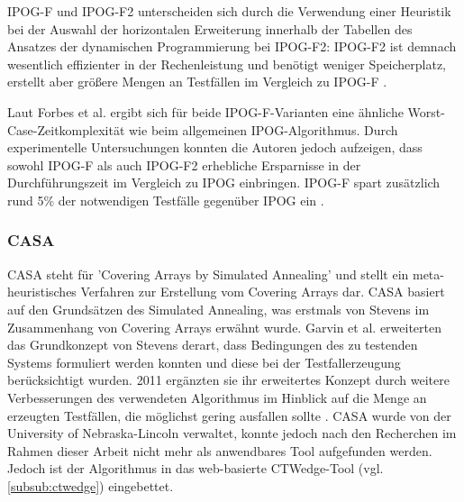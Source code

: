 IPOG-F und IPOG-F2 unterscheiden sich durch die Verwendung einer Heuristik bei der Auswahl der horizontalen Erweiterung innerhalb der Tabellen des Ansatzes der dynamischen Programmierung bei IPOG-F2: IPOG-F2 ist demnach wesentlich effizienter in der Rechenleistung und benötigt weniger Speicherplatz, erstellt aber größere Mengen an Testfällen im Vergleich zu IPOG-F \cite{forbes2008refining}. 

Laut Forbes et al. \cite{forbes2008refining} ergibt sich für beide IPOG-F-Varianten eine ähnliche Worst-Case-Zeitkomplexität wie beim allgemeinen IPOG-Algorithmus. Durch experimentelle Untersuchungen konnten die Autoren jedoch aufzeigen, dass sowohl IPOG-F als auch IPOG-F2 erhebliche Ersparnisse in der Durchführungszeit im Vergleich zu IPOG einbringen. IPOG-F spart zusätzlich rund 5\% der notwendigen Testfälle gegenüber IPOG ein \cite{forbes2008refining}.



\subsubsection{CASA}\label{subsub:casa}

CASA \cite{garvin2009improved, garvin2011evaluating} steht für 'Covering Arrays by Simulated Annealing' und stellt ein meta-heuristisches Verfahren zur Erstellung vom Covering Arrays dar. CASA basiert auf den Grundsätzen des Simulated Annealing, was erstmals von Stevens \cite{stevens1999transversal} im Zusammenhang von Covering Arrays erwähnt wurde. Garvin et al. \cite{garvin2009improved} erweiterten das Grundkonzept von Stevens derart, dass Bedingungen des zu testenden Systems formuliert werden konnten und diese bei der Testfallerzeugung berücksichtigt wurden. 2011 ergänzten sie ihr erweitertes Konzept durch weitere Verbesserungen des verwendeten Algorithmus im Hinblick auf die Menge an erzeugten Testfällen, die möglichst gering ausfallen sollte \cite{garvin2011evaluating}. CASA wurde von der University of Nebraska-Lincoln verwaltet, konnte jedoch nach den Recherchen im Rahmen dieser Arbeit nicht mehr als anwendbares Tool aufgefunden werden. Jedoch ist der Algorithmus in das web-basierte CTWedge-Tool (vgl. \autoref{subsub:ctwedge}) eingebettet.

